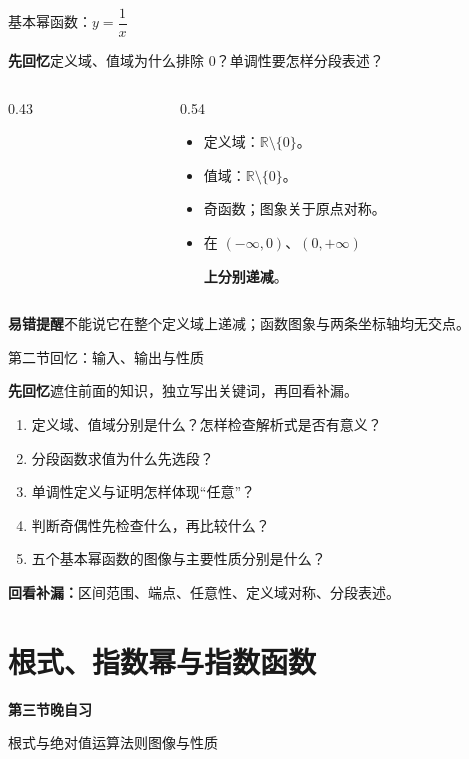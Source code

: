 \documentclass[UTF8,10pt,aspectratio=169,handout]{ctexbeamer}
\newcommand{\Recall}[1]{\par\noindent\textcolor{KnowledgeBlue}{\textbf{先回忆}\quad #1}\par\vspace{0.3cm}}
\newcommand{\Pitfall}[1]{\par\vspace{0.22cm}\noindent\textbf{易错提醒}\quad #1\par}
\newcommand{\Session}[3]{\section{#2}\begin{frame}\vspace{0.7cm}\begin{center}{\Large\bfseries 第#1节晚自习}\par\vspace{0.5cm}{\LARGE\bfseries #2}\par\vspace{0.6cm}#3\end{center}\end{frame}}
\begin{document}
\begin{frame}[t]{基本幂函数：$y=\dfrac1x$}
\large
\Recall{定义域、值域为什么排除 $0$？单调性要怎样分段表述？}
\pause
\begin{columns}[c,onlytextwidth]
\begin{column}{0.43\textwidth}
\centering
{}
\end{column}
\begin{column}{0.54\textwidth}
\begin{itemize}
  \item 定义域：$\mathbb R\setminus\{0\}$。
  \item 值域：$\mathbb R\setminus\{0\}$。
  \item 奇函数；图象关于原点对称。
  \item 在 $(-\infty,0)$、$(0,+\infty)$\par\textbf{上分别递减}。
\end{itemize}
\end{column}
\end{columns}
\Pitfall{不能说它在整个定义域上递减；函数图象与两条坐标轴均无交点。}
\end{frame}


\begin{frame}[t]{第二节回忆：输入、输出与性质}
\Recall{遮住前面的知识，独立写出关键词，再回看补漏。}
\begin{enumerate}
\item 定义域、值域分别是什么？怎样检查解析式是否有意义？
\item 分段函数求值为什么先选段？
\item 单调性定义与证明怎样体现“任意”？
\item 判断奇偶性先检查什么，再比较什么？
\item 五个基本幂函数的图像与主要性质分别是什么？
\end{enumerate}
\pause
\par\vspace{0.2cm}\textbf{回看补漏：}区间范围、端点、任意性、定义域对称、分段表述。
\end{frame}

\Session{三}{根式、指数幂与指数函数}{根式与绝对值\quad 运算法则\quad 图像与性质}
\end{document}
